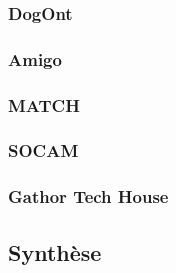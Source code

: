 \subsubsection{DogOnt}
\subsubsection{Amigo}
\subsubsection{MATCH}
\subsubsection{SOCAM}
\subsubsection{Gathor Tech House}
\subsection{Synthèse}
